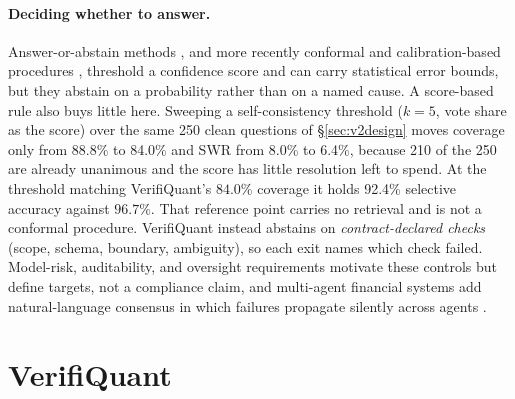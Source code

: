 \documentclass[sigconf,anonymous]{acmart}
\newcommand{\scCovOpen}{88.8\%}      %
\newcommand{\scSWRopen}{8.0\%}       %
\newcommand{\scCovTight}{84.0\%}     %
\newcommand{\scSWRtight}{6.4\%}      %
\newcommand{\scSelAccTight}{92.4\%}  %
\newcommand{\scUnanimous}{210}       %
\begin{document}
\paragraph{Deciding whether to answer.}
Answer-or-abstain methods \cite{elyaniv2010foundations,geifman2017selective}, and more recently conformal and calibration-based procedures \cite{quach2024conformal,kadavath2022language}, threshold a confidence score and can carry statistical error bounds, but they abstain on a probability rather than on a named cause. A score-based rule also buys little here. Sweeping a self-consistency threshold ($k{=}5$, vote share as the score) over the same 250 clean questions of \S\ref{sec:v2design} moves coverage only from \scCovOpen{} to \scCovTight{} and SWR from \scSWRopen{} to \scSWRtight{}, because \scUnanimous{} of the 250 are already unanimous and the score has little resolution left to spend. At the threshold matching VerifiQuant's $84.0\%$ coverage it holds \scSelAccTight{} selective accuracy against $96.7\%$. That reference point carries no retrieval and is not a conformal procedure. VerifiQuant instead abstains on \emph{contract-declared checks} (scope, schema, boundary, ambiguity), so each exit names which check failed. Model-risk, auditability, and oversight requirements \cite{fed2011sr117,euaiact2024,finra2020ai} motivate these controls but define targets, not a compliance claim, and multi-agent financial systems \cite{kundu2025multiagent} add natural-language consensus in which failures propagate silently across agents \cite{cemri2025mas}.

\section{VerifiQuant}\label{sec:v2method}
\end{document}
